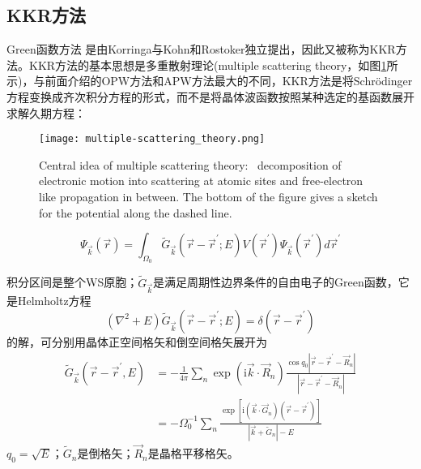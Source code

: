 \subsection{KKR方法}
Green函数方法%
是由Korringa\cite{P13-392_1947}与Kohn和Rostoker\cite{PR94-1111_1954}独立提出，因此又被称为KKR方法。KKR方法的基本思想是多重散射理论(multiple scattering theory，如图\ref{Multi-scattering}所示)，与前面介绍的OPW方法和APW方法最大的不同，KKR方法是将Schr\"odinger方程变换成齐次积分方程的形式，而不是将晶体波函数按照某种选定的基函数展开求解久期方程\cite{Ziman,Lizhengzhong}：
\begin{figure}[h!]
\centering
\texttt{[image: multiple-scattering\_theory.png]}
\caption{\small \textrm{Central idea of multiple scattering theory:~ decomposition of electronic motion into scattering at atomic sites and free-electron like propagation in between. The bottom of the figure gives a sketch for the potential along the dashed line.}}
\label{Multi-scattering}
\end{figure}
\begin{equation}
  \Psi_{\vec k}(\vec r)=\int_{\Omega_0}\tilde G_{\vec k}(\vec r-\vec r^{\prime};E)V(\vec r^{\prime})\Psi_{\vec k}(\vec r^{\prime})d\vec r^{\prime}
  \label{eq:solid-116}
\end{equation}

积分区间是整个WS原胞；$\tilde G_{\vec k}$是满足周期性边界条件的自由电子的Green函数，它是Helmholtz方程
\begin{equation}
  (\nabla^2+E)\tilde G_{\vec k}(\vec r-\vec r^{\prime};E)=\delta(\vec r-\vec r^{\prime})
  \label{eq:solid-118}
\end{equation}
的解，可分别用晶体正空间格矢和倒空间格矢展开为
\begin{equation}
  \begin{split}
	  \tilde G_{\vec k}(\vec r-\vec r^{\prime},E)&=-\frac1{4\pi}\sum_n\exp(\mathrm{i}\vec k\cdot\vec R_n)\frac{\cos q_0|\vec r-\vec r^{\prime}-\vec R_n|}{|\vec r-\vec r^{\prime}-\vec R_n|}\\
	  &=-\Omega_0^{-1}\sum_n\frac{\exp[\mathrm{i}(\vec k\cdot\vec G_n)(\vec r-\vec r^{\prime})]}{|\vec k+\tilde G_n|-E}
  \end{split}
  \label{eq:solid-117}
\end{equation}
$q_0=\sqrt E$；$\tilde G_n$是倒格矢；$\vec R_n$是晶格平移格矢。


